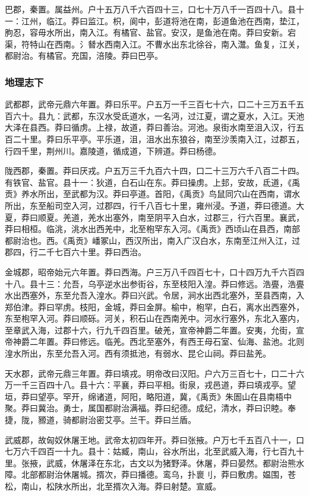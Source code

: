 \documentclass[]{article}
\begin{document}
巴郡，秦置。属益州。户十五万八千六百四十三，口七十万八千一百四十八。县十一：江州，临江。莽曰监江。枳，阆中，彭道将池在南，彭道鱼池在西南，垫江，朐忍，容毋水所出，南入江。有橘官、盐官。安汉，是鱼池在南。莽曰安新。宕渠，符特山在西南。氵朁水西南入江。不曹水出东北徐谷，南入灊。鱼复，江关，都尉治。有橘官。充国，涪陵。莽曰巴亭。

\hypertarget{header-n2592}{%
\subsubsection{地理志下}\label{header-n2592}}

武都郡，武帝元鼎六年置。莽曰乐平。户五万一千三百七十六，口二十三万五千五百六十。县九：武都，东汉水受氐道水，一名沔，过江夏，谓之夏水，入江。天池大泽在县西。莽曰循虏。上禄，故道，莽曰善治。河池。泉街水南至沮入汉，行五百二十里。莽曰乐平亭。平乐道，沮，沮水出东狼谷，南至沙羡南入江，过郡五，行四千里，荆州川。嘉陵道，循成道，下辨道。莽曰杨德。

陇西郡，秦置。莽曰厌戎。户五万三千九百六十四，口二十三万六千八百二十四。有铁官、盐官。县十一：狄道，白石山在东。莽曰操虏。上邽，安故，氐道，《禹贡》养水所出，至武都为汉。莽曰亭道。首阳，《禹贡》鸟鼠同穴山在西南，谓水所出，东至船司空入河，过郡四，行千八百七十里，雍州浸。予道，莽曰德道。大夏，莽曰顺夏。羌道，羌水出塞外，南至阴平入白水，过郡三，行六百里。襄武，莽曰相桓。临洮，洮水出西羌中，北至枹罕东入河。《禹贡》西顷山在县西，南部都尉治也。西。《禹贡》嶓冢山，西汉所出，南入广汉白水，东南至江州入江，过郡四，行二千七百六十里。莽曰西治。

金城郡，昭帝始元六年置。莽曰西海。户三万八千四百七十，口十四万九千六百四十八。县十三：允吾，乌亭逆水出参街谷，东至枝阳入湟。莽曰修远。浩亹，浩亹水出西塞外，东至允吾入湟水。莽曰兴武。令居，涧水出西北塞外，至县西南，入郑伯津。莽曰罕虏。枝阳，金城，莽曰金屏。榆中，枹罕，白石，离水出西塞外，东至枹罕入河。莽曰顺砾。河关，积石山在西南羌中。河水行塞外，东北入塞内，至章武入海，过郡十六，行九千四百里。破羌，宣帝神爵二年置。安夷，允街，宣帝神爵二年置。莽曰修远。临羌。西北至塞外，有西王母石室、仙海、盐池。北则湟水所出，东至允吾入河。西有须抵池，有弱水、昆仑山祠。莽曰盐羌。

天水郡，武帝元鼎三年置。莽曰填戎。明帝改曰汉阳。户六万三百七十，口二十六万一千三百四十八。县十六：平襄，莽曰平相。街泉，戎邑道，莽曰填戎亭。望垣，莽曰望亭。罕开，绵诸道，阿阳，略阳道，冀，《禹贡》朱圄山在县南梧中聚。莽曰冀治。勇士，属国都尉治满福。莽曰纪德。成纪，清水，莽曰识睦。奉捷，陇，豲道，骑都尉治密艾亭。兰干。莽曰兰盾。

武威郡，故匈奴休屠王地。武帝太初四年开。莽曰张掖。户万七千五百八十一，口七万六千四百一十九。县十：姑臧，南山，谷水所出，北至武威入海，行七百九十里。张掖，武威，休屠泽在东北，古文以为猪野泽。休屠，莽曰晏然。都尉治熊水障。北部都尉治休屠城。揟次，莽曰播德。鸾乌，扑褱刂，莽曰敷虏。媪围，苍松，南山，松陕水所出，北至揟次入海。莽曰射楚。宣威。
\end{document}
